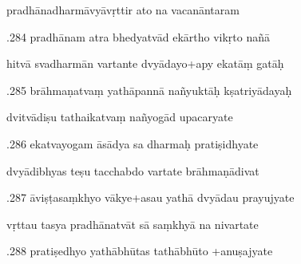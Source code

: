 \documentclass[article,12pt,a4paper]{memoir}%
\newcounter{parCount}
\begin{document}
	  
	  \pstart \leavevmode%
	pradhānadharmāvyāvṛttir ato na vacanāntaram 
	{}
	\pend%
      

	  
	  \pstart {}.284 pradhānam atra bhedyatvād ekārtho vikṛto nañā 
	{}
	\pend%
      

	  
	  \pstart \leavevmode%
	hitvā svadharmān vartante dvyādayo+apy ekatāṃ gatāḥ 
	{}
	\pend%
      

	  
	  \pstart {}.285 brāhmaṇatvaṃ yathāpannā nañyuktāḥ kṣatriyādayaḥ 
	{}
	\pend%
      

	  
	  \pstart \leavevmode%
	dvitvādiṣu tathaikatvaṃ nañyogād upacaryate 
	{}
	\pend%
      

	  
	  \pstart {}.286 ekatvayogam āsādya sa dharmaḥ pratiṣidhyate 
	{}
	\pend%
      

	  
	  \pstart \leavevmode%
	dvyādibhyas teṣu tacchabdo vartate brāhmaṇādivat 
	{}
	\pend%
      

	  
	  \pstart {}.287 āviṣṭasaṃkhyo vākye+asau yathā dvyādau prayujyate 
	{}
	\pend%
      

	  
	  \pstart \leavevmode%
	vṛttau tasya pradhānatvāt sā saṃkhyā na nivartate 
	{}
	\pend%
      

	  
	  \pstart {}.288 pratiṣedhyo yathābhūtas tathābhūto +anuṣajyate 
	{}
	\pend%
      
\end{document}
